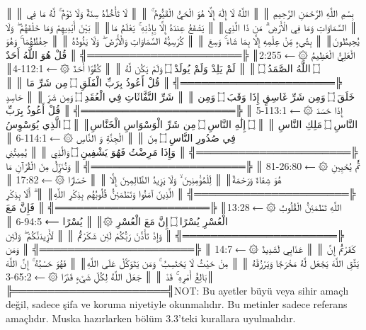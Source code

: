 \documentclass[12pt,a4paper]{article}
\begin{document}
║  بِسْمِ اللَّهِ الرَّحْمَنِ الرَّحِيمِ          ║
║  اللَّهُ لَا إِلَٰهَ إِلَّا هُوَ الْحَيُّ الْقَيُّومُ ۚ ║
║  لَا تَأْخُذُهُ سِنَةٌ وَلَا نَوْمٌ ۚ لَّهُ مَا فِي ║
║  السَّمَاوَاتِ وَمَا فِي الْأَرْضِ ۗ مَن ذَا الَّذِي║
║  يَشْفَعُ عِندَهُ إِلَّا بِإِذْنِهِ ۚ يَعْلَمُ مَا║
║  بَيْنَ أَيْدِيهِمْ وَمَا خَلْفَهُمْ ۖ وَلَا يُحِيطُونَ║
║  بِشَيْءٍ مِّنْ عِلْمِهِ إِلَّا بِمَا شَاءَ ۚ وَسِعَ ║
║  كُرْسِيُّهُ السَّمَاوَاتِ وَالْأَرْضَ ۖ وَلَا يَئُودُهُ ║
║  حِفْظُهُمَا ۚ وَهُوَ الْعَلِيُّ الْعَظِيمُ ۞ ⟵ 2:255║
╠══════════════════════╣
║  قُلْ هُوَ اللَّهُ أَحَدٌ ۝ اللَّهُ الصَّمَدُ ۝    ║
║  لَمْ يَلِدْ وَلَمْ يُولَدْ ۝ وَلَمْ يَكُن لَّهُ ║
║  كُفُوًا أَحَدٌ ۞ ⟵ 112:1-4║
╠══════════════════════╣
║  قُلْ أَعُوذُ بِرَبِّ الْفَلَقِ ۝ مِن شَرِّ مَا   ║
║  خَلَقَ ۝ وَمِن شَرِّ غَاسِقٍ إِذَا وَقَبَ ۝ وَمِن  ║
║  شَرِّ النَّفَّاثَاتِ فِي الْعُقَدِ ۝ وَمِن شَرِّ ║
║  حَاسِدٍ إِذَا حَسَدَ ۞ ⟵ 113:1-5    ║
╠══════════════════════╣
║  قُلْ أَعُوذُ بِرَبِّ النَّاسِ ۝ مَلِكِ النَّاسِ  ║
║  ۝ إِلَٰهِ النَّاسِ ۝ مِن شَرِّ الْوَسْوَاسِ الْخَنَّاسِ║
║  ۝ الَّذِي يُوَسْوِسُ فِي صُدُورِ النَّاسِ ۝ مِنَ ║
║  الْجِنَّةِ وَ النَّاسِ ۞ ⟵ 114:1-6   ║
╠══════════════════════╣
║  وَإِذَا مَرِضْتُ فَهُوَ يَشْفِينِ ۝ وَالَّذِي  ║
║  يُمِيتُنِي ثُمَّ يُحْيِينِ ۞ ⟵ 26:80-81   ║
╠══════════════════════╣
║  وَنُنَزِّلُ مِنَ الْقُرْآنِ مَا هُوَ شِفَاءٌ وَرَحْمَةٌ║
║  لِّلْمُؤْمِنِينَ ۙ وَلَا يَزِيدُ الظَّالِمِينَ إِلَّا ║
║  خَسَارًا ۞ ⟵ 17:82             ║
╠══════════════════════╣
║  الَّذِينَ آمَنُوا وَتَطْمَئِنُّ قُلُوبُهُم بِذِكْرِ اللَّهِ║
║  ۗ أَلَا بِذِكْرِ اللَّهِ تَطْمَئِنُّ الْقُلُوبُ ۞ ⟵ 13:28║
╠══════════════════════╣
║  فَإِنَّ مَعَ الْعُسْرِ يُسْرًا ۝ إِنَّ مَعَ الْعُسْرِ ۞║
║  يُسْرًا ⟵ 94:5-6           ║
╠══════════════════════╣
║  وَإِذْ تَأَذَّنَ رَبُّكُمْ لَئِن شَكَرْتُمْ  ║
║  لَأَزِيدَنَّكُمْ ۖ وَلَئِن كَفَرْتُمْ إِنَّ  ║
║  عَذَابِي لَشَدِيدٌ ۞ ⟵ 14:7    ║
╠══════════════════════╣
║  وَمَن يَتَّقِ اللَّهَ يَجْعَل لَّهُ مَخْرَجًا وَيَرْزُقْهُ ║
║  مِنْ حَيْثُ لَا يَحْتَسِبُ ۚ وَمَن يَتَوَكَّلْ عَلَى اللَّهِ║
║  فَهُوَ حَسْبُهُ ۚ إِنَّ اللَّهَ بَالِغُ أَمْرِهِ ۚ قَدْ ║
║  جَعَلَ اللَّهُ لِكُلِّ شَيْءٍ قَدْرًا ۞ ⟵ 65:2-3║
╠══════════════════════╣NOT: Bu ayetler büyü veya sihir amaçlı değil, sadece şifa ve koruma niyetiyle okunmalıdır.
Bu metinler sadece referans amaçlıdır. Muska hazırlarken bölüm 3.3'teki kurallara uyulmalıdır.
\end{document}
